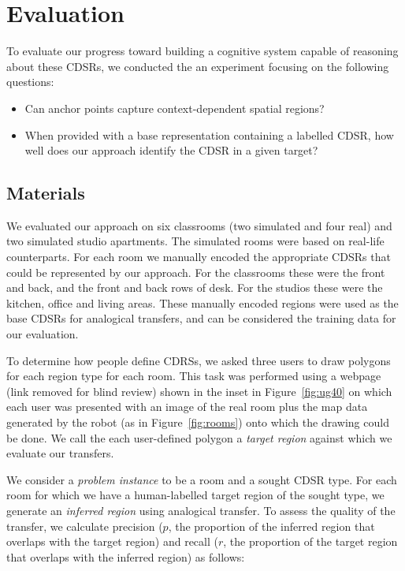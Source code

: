 \section{Evaluation}\label{sec:evaluation}

To evaluate our progress toward building a cognitive system capable of reasoning about these CDSRs, we conducted the an experiment focusing on the following questions:
\begin{itemize}
\item{Can anchor points capture context-dependent spatial regions?}
\item{When provided with a base representation containing a labelled CDSR, how well does our approach identify the CDSR in a given target?}
\end{itemize}

\subsection{Materials}

We evaluated our approach on six classrooms (two simulated and four real) and two simulated studio apartments. The simulated rooms were based on real-life counterparts. For each room we manually encoded the appropriate CDSRs that could be represented by our approach. For the classrooms these were the front and back, and the front and back rows of desk. For the studios these were the kitchen, office and living areas. These manually encoded regions were used as the base CDSRs for analogical transfers, and can be considered the training data for our evaluation. 

To determine how people define CDRSs, we asked three users to draw polygons for each region type for each room. This task was performed using a webpage (link removed for blind review) shown in the inset in Figure~\ref{fig:ug40} on which each user was presented with an image of the real room plus the map data generated by the robot (as in Figure~\ref{fig:rooms}) onto which the drawing could be done. We call the each user-defined polygon a \textit{target region} against which we evaluate our transfers.

We consider a \textit{problem instance} to be a room and a sought CDSR type. For each room for which we have a human-labelled target region of the sought type, we generate an \textit{inferred region} using analogical transfer. To assess the quality of the transfer, we calculate precision ($p$, the proportion of the inferred region that overlaps with the target region) and recall ($r$, the proportion of the target region that overlaps with the inferred region) as follows:

